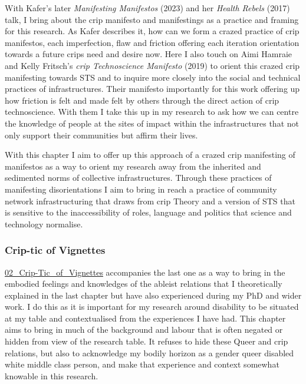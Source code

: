 With Kafer's later \emph{Manifesting Manifestos} (2023) and her
\emph{Health Rebels} (2017) talk, I bring about the crip manifesto and
manifestings as a practice and framing for this research. As Kafer
describes it, how can we form a crazed practice of crip manifestos, each
imperfection, flaw and friction offering each iteration orientation
towards a future crips need and desire now. Here I also touch on Aimi
Hamraie and Kelly Fritsch's \emph{crip Technoscience Manifesto} (2019)
to orient this crazed crip manifesting towards STS and to inquire more
closely into the social and technical practices of infrastructures.
Their manifesto importantly for this work offering up how friction is
felt and made felt by others through the direct action of crip
technoscience. With them I take this up in my research to ask how we can
centre the knowledge of people at the sites of impact within the
infrastructures that not only support their communities but affirm their
lives.

With this chapter I aim to offer up this approach of a crazed crip
manifesting of manifestos as a way to orient my research away from the
inherited and sedimented norms of collective infrastructures. Through
these practices of manifesting disorientations I aim to bring in reach a
practice of community network infrastructuring that draws from crip
Theory and a version of STS that is sensitive to the inaccessibility of
roles, language and politics that science and technology normalise.

\hypertarget{crip-tic-of-vignettes}{%
\subsubsection[Crip-tic of
Vignettes]{\texorpdfstring{\protect\hypertarget{anchor}{}{}Crip-tic of
Vignettes}{Crip-tic of Vignettes}}\label{crip-tic-of-vignettes}}

\href{../../02_Crip-Tic_of_Vignettes/02_Crip-Tic_of_Vignettes.md}{02\_Crip-Tic\_of\_Vignettes}
accompanies the last one as a way to bring in the embodied feelings and
knowledges of the ableist relations that I theoretically explained in
the last chapter but have also experienced during my PhD and wider work.
I do this as it is important for my research around disability to be
situated at my table and contextualised from the experiences I have had.
This chapter aims to bring in much of the background and labour that is
often negated or hidden from view of the research table. It refuses to
hide these Queer and crip relations, but also to acknowledge my bodily
horizon as a gender queer disabled white middle class person, and make
that experience and context somewhat knowable in this research.

